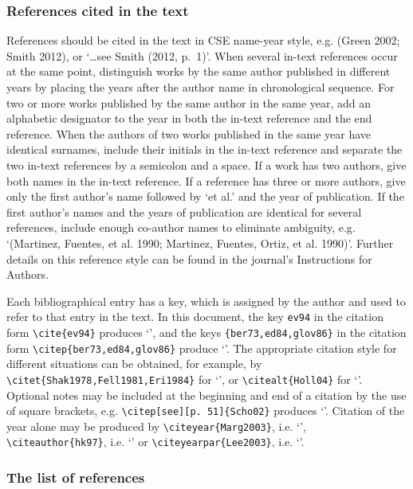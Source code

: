 \documentclass{gCMB2e}
\begin{document}
\subsubsection{References cited in the text}

References should be cited in the text in CSE name-year style, e.g. (Green 2002; Smith 2012), or `\ldots see Smith (2012, p.~1)'. When several in-text references occur at the same point, distinguish works by the same author published in different years by placing the years after the author name in chronological sequence. For two or more works published by the same author in the same year, add an alphabetic designator to the year in both the in-text reference and the end reference. When the authors of two works published in the same year have identical surnames, include their initials in the in-text reference and separate the two in-text references by a semicolon and a space. If a work has two authors, give both names in the in-text reference. If a reference has three or more authors, give only the first author's name followed by `et al.' and the year of publication. If the first author's names and the years of publication are identical for several references, include enough co-author names to eliminate ambiguity, e.g. `(Martinez, Fuentes, et al. 1990; Martinez, Fuentes, Ortiz, et al. 1990)'. Further details on this reference style can be found in the journal's Instructions for Authors.

Each bibliographical entry has a key, which is assigned by the author and used to refer to that entry in the text. In this document, the key \verb"ev94" in the citation form \verb"\cite{ev94}" produces `\cite{ev94}', and the keys \verb"{ber73,ed84,glov86}" in the citation form \verb"\citep{ber73,ed84,glov86}" produce `\citep{ber73,ed84,glov86}'. The appropriate citation style for different situations can be obtained, for example, by \verb"\citet{Shak1978,Fell1981,Eri1984}" for `\citet{Shak1978,Fell1981,Eri1984}', or \verb"\citealt{Holl04}" for `\citealt{Holl04}'. Optional notes may be included at the beginning and end of a citation by the use of square brackets, e.g. \verb"\citep[see][p. 51]{Scho02}" produces `\citep[see][p. 51]{Scho02}'. Citation of the year alone may be produced by \verb"\citeyear{Marg2003}", i.e. `\citeyear{Marg2003}', \verb"\citeauthor{hk97}", i.e. `\citeauthor{hk97}' or \verb"\citeyearpar{Lee2003}", i.e. `\citeyearpar{Lee2003}'.

\subsubsection{The list of references}
\end{document}
